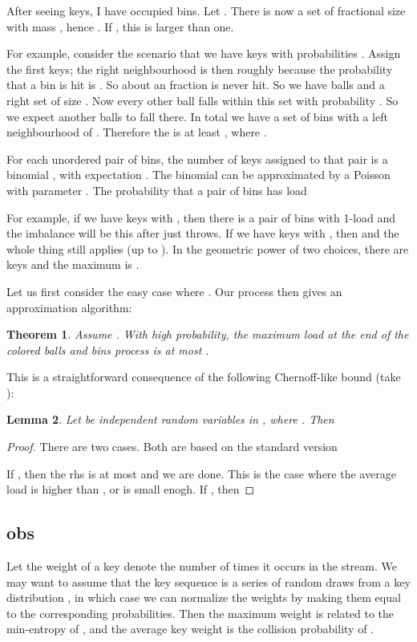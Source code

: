 \documentclass[10pt,conference,letterpaper]{IEEEtran}
\newtheorem{theorem}{Theorem}[section]
\newtheorem{lemma}[theorem]{Lemma}
\begin{document}
{{After seeing  keys, I have occupied  bins. Let .
There is now a set of fractional size  with mass ,
      hence . If , this is larger than one.

For example, consider the scenario that we have  keys with probabilities . Assign the first  keys; the right neighbourhood is
then roughly  because the probability that a bin is hit is . So about an  fraction is never hit. So we have
 balls and a right set of size . Now every other ball falls within this set with probability . So we expect another
 balls to fall there. In total we have a set of  bins with a left neighbourhood of . Therefore the 
is at least , where .

For each unordered pair of bins, the number of keys assigned to that
pair is a binomial , with expectation . The binomial can be approximated by a Poisson with parameter .
The probability that a pair of bins has load

For example, if we have  keys with , then there is a pair of bins with 1-load  and the imbalance will be this after just  throws.
If we have  keys with , then  and the whole thing still applies (up to ).
In the geometric power of two choices, there are  keys and the maximum  is .




Let us first consider the easy case where . Our process then gives an  approximation algorithm:
\begin{theorem}
Assume . With high probability, the maximum load at the end of the colored balls and bins process is at most .
\end{theorem}

This is a straightforward consequence of the following Chernoff-like bound (take ):
\begin{lemma}
Let  be independent random variables in , where .
Then

\end{lemma}
\begin{proof}
There are two cases. Both are based on the standard version


If , then the rhs is at most  and we are done. This is the case where the average load is higher than , or 
is small enogh.
If , then

\end{proof}
}

\subsection{obs}
Let the weight of a key denote the number of times it occurs in the stream.
We may want to assume that the key sequence is a series of  random draws from a key distribution , in which case we can normalize the
 weights by making them equal to the corresponding probabilities. Then the maximum weight is related to the min-entropy of ,
 and the average key weight is the collision probability of .


}
\end{document}
